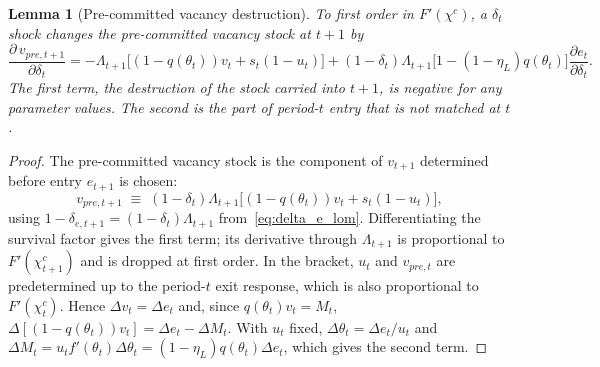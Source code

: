 \documentclass[authoryear, review, 12pt]{elsarticle}
\newtheorem{lemma}{Lemma}
\begin{document}
\begin{lemma}[Pre-committed vacancy destruction]
\label{lem:vpre}
To first order in $F'(\chi^c)$, a $\delta_t$ shock changes the
pre-committed vacancy stock at $t+1$ by
\[
	\frac{\partial\,v_{pre,t+1}}{\partial\delta_t}
	= -\Lambda_{t+1}\bigl[(1-q(\theta_t))v_t+s_t(1-u_t)\bigr]
	+(1-\delta_t)\Lambda_{t+1}\bigl[1-(1-\eta_L)q(\theta_t)\bigr]
	\frac{\partial e_t}{\partial\delta_t}.
\]
The first term, the destruction of the stock carried into $t+1$, is
negative for any parameter values. The second is the part of
period-$t$ entry that is not matched at $t$.
\end{lemma}

\begin{proof}
The pre-committed vacancy stock is the component of $v_{t+1}$ determined
before entry $e_{t+1}$ is chosen:
\[
	v_{pre,t+1}
	\;\equiv\;
	(1-\delta_t)\Lambda_{t+1}\bigl[(1-q(\theta_t))v_t
	+s_t(1-u_t)\bigr],
\]
using $1-\delta_{e,t+1}=(1-\delta_t)\Lambda_{t+1}$
from~\eqref{eq:delta_e_lom}. Differentiating the survival factor gives
the first term; its derivative through $\Lambda_{t+1}$ is proportional to
$F'(\chi^c_{t+1})$ and is dropped at first order. In the bracket, $u_t$
and $v_{pre,t}$ are predetermined up to the period-$t$ exit response,
which is also proportional to $F'(\chi^c_t)$. Hence $\Delta v_t=\Delta e_t$
and, since $q(\theta_t)v_t=M_t$,
$\Delta[(1-q(\theta_t))v_t]=\Delta e_t-\Delta M_t$. With $u_t$ fixed,
$\Delta\theta_t=\Delta e_t/u_t$ and
$\Delta M_t=u_tf'(\theta_t)\Delta\theta_t=(1-\eta_L)q(\theta_t)\Delta e_t$,
which gives the second term.
\end{proof}
\end{document}
